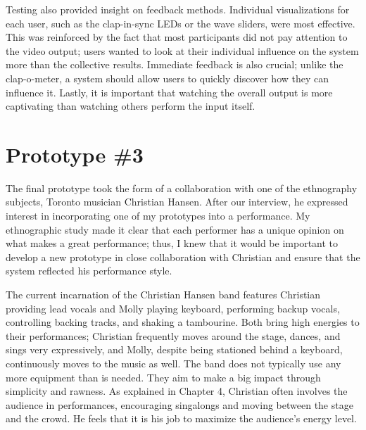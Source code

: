 Testing also provided insight on feedback methods. Individual visualizations for each user, such as the clap-in-sync LEDs or the wave sliders, were most effective. This was reinforced by the fact that most participants did not pay attention to the video output; users wanted to look at their individual influence on the system more than the collective results. Immediate feedback is also crucial; unlike the clap-o-meter, a system should allow users to quickly discover how they can influence it. Lastly, it is important that watching the overall output is more captivating than watching others perform the input itself.



\section{Prototype \#3}

The final prototype took the form of a collaboration with one of the ethnography subjects, Toronto musician Christian Hansen. After our interview, he expressed interest in incorporating one of my prototypes into a performance. My ethnographic study made it clear that each performer has a unique opinion on what makes a great performance; thus, I knew that it would be important to develop a new prototype in close collaboration with Christian and ensure that the system reflected his performance style.

The current incarnation of the Christian Hansen band features Christian providing lead vocals and Molly playing keyboard, performing backup vocals, controlling backing tracks, and shaking a tambourine. Both bring high energies to their performances; Christian frequently moves around the stage, dances, and sings very expressively, and Molly, despite being stationed behind a keyboard, continuously moves to the music as well. The band does not typically use any more equipment than is needed. They aim to make a big impact through simplicity and rawness. As explained in Chapter 4, Christian often involves the audience in performances, encouraging singalongs and moving between the stage and the crowd. He feels that it is his job to maximize the audience's energy level.

